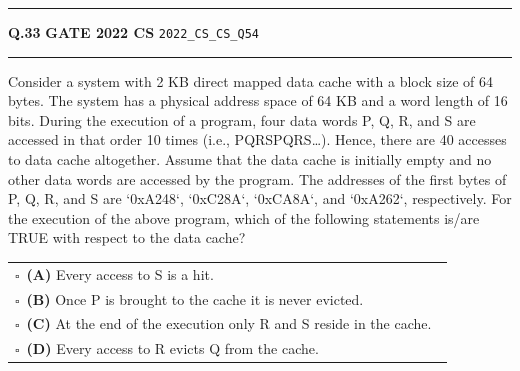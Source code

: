 \documentclass[a4paper,10pt]{article}
\begin{document}
\vspace{6pt}\hrule height 0.35pt\vspace{6pt}
\noindent
\begin{tcolorbox}[
    blanker,
    sidebyside,
    sidebyside align=top,
    lefthand width=0.55\textwidth,
    top=4pt, bottom=4pt, left=0pt, right=0pt,
    middle=16pt,
    underlay={
        \draw[dashed, black!80, line width=0.8pt, dash pattern=on 4pt off 3pt]
            ([xshift=0.55\textwidth+8pt]frame.north west) --
            ([xshift=0.55\textwidth+8pt]frame.south west);
    }
]
\textbf{Q.33}  \hfill {\footnotesize\textbf{GATE 2022 CS} \quad \tiny\texttt{2022\_CS\_CS\_Q54}}
\vspace{2pt}\hrule height 0.3pt\vspace{4pt}

Consider a system with 2 KB direct mapped data cache with a block size of 64 bytes. The system has a physical address space of 64 KB and a word length of 16 bits. During the execution of a program, four data words P, Q, R, and S are accessed in that order 10 times (i.e., PQRSPQRS\dots). Hence, there are 40 accesses to data cache altogether. Assume that the data cache is initially empty and no other data words are accessed by the program. The addresses of the first bytes of P, Q, R, and S are `0xA248`, `0xC28A`, `0xCA8A`, and `0xA262`, respectively. For the execution of the above program, which of the following statements is/are TRUE with respect to the data cache?

\par\vspace{6pt}\noindent
\begin{tabular}{@{}p{0.98\linewidth}@{}}
$\square$\ \textbf{(A)} Every access to S is a hit. \\
\addlinespace[3pt]
$\square$\ \textbf{(B)} Once P is brought to the cache it is never evicted. \\
\addlinespace[3pt]
$\square$\ \textbf{(C)} At the end of the execution only R and S reside in the cache. \\
\addlinespace[3pt]
$\square$\ \textbf{(D)} Every access to R evicts Q from the cache.
\end{tabular}

\tcblower


\end{tcolorbox}
\end{document}

